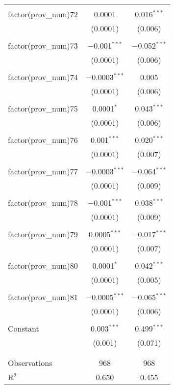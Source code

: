 \begin{table}[ht!]
\begin{tabular}{@{\extracolsep{5pt}}lcc}
  & & \\ 
 factor(prov\_num)72 & 0.0001 & 0.016$^{***}$ \\ 
  & (0.0001) & (0.006) \\ 
  & & \\ 
 factor(prov\_num)73 & $-$0.001$^{***}$ & $-$0.052$^{***}$ \\ 
  & (0.0001) & (0.006) \\ 
  & & \\ 
 factor(prov\_num)74 & $-$0.0003$^{***}$ & 0.005 \\ 
  & (0.0001) & (0.006) \\ 
  & & \\ 
 factor(prov\_num)75 & 0.0001$^{*}$ & 0.043$^{***}$ \\ 
  & (0.0001) & (0.006) \\ 
  & & \\ 
 factor(prov\_num)76 & 0.001$^{***}$ & 0.020$^{***}$ \\ 
  & (0.0001) & (0.007) \\ 
  & & \\ 
 factor(prov\_num)77 & $-$0.0003$^{***}$ & $-$0.064$^{***}$ \\ 
  & (0.0001) & (0.009) \\ 
  & & \\ 
 factor(prov\_num)78 & $-$0.001$^{***}$ & 0.038$^{***}$ \\ 
  & (0.0001) & (0.009) \\ 
  & & \\ 
 factor(prov\_num)79 & 0.0005$^{***}$ & $-$0.017$^{***}$ \\ 
  & (0.0001) & (0.007) \\ 
  & & \\ 
 factor(prov\_num)80 & 0.0001$^{*}$ & 0.042$^{***}$ \\ 
  & (0.0001) & (0.005) \\ 
  & & \\ 
 factor(prov\_num)81 & $-$0.0005$^{***}$ & $-$0.065$^{***}$ \\ 
  & (0.0001) & (0.006) \\ 
  & & \\ 
 Constant & 0.003$^{***}$ & 0.499$^{***}$ \\ 
  & (0.001) & (0.071) \\ 
  & & \\ 
\hline \\[-1.8ex] 
Observations & 968 & 968 \\ 
R$^{2}$ & 0.650 & 0.455 \\ 

\end{tabular}
\end{table}

